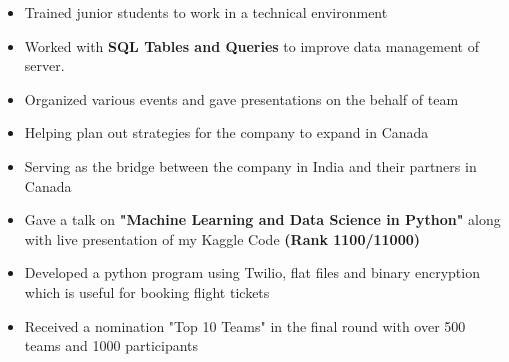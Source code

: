 \documentclass[10pt,a4paper]{altacv}
\begin{document}
\begin{itemize}
\item Trained junior students to work in a technical environment
\item Worked with \textbf{SQL Tables and Queries} to improve data management of server.
\item Organized various events and gave presentations on the behalf of team
\end{itemize}

\divider

\begin{itemize}
\item Helping plan out strategies for the company to expand in Canada
\item Serving as the bridge between the company in India and their partners in Canada
\end{itemize}



\begin{itemize}
\item Gave a talk on\textbf{ "Machine Learning and Data Science in Python"} along with live presentation of my Kaggle Code \textbf{(Rank 1100/11000)}
\end{itemize}

\divider


\begin{itemize}
\item Developed a python program using Twilio, flat files and binary encryption which is useful for booking flight tickets
\item Received a nomination "Top 10 Teams" in the final round with over 500 teams and 1000 participants
\end{itemize}





\end{document}
